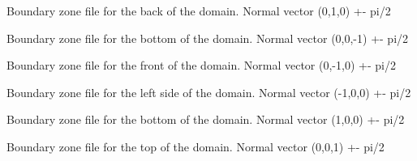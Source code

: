 \documentclass[letterpaper,10pt,english]{sphinxmanual}
\begin{document}

\label{\detokenize{output:pboundary-back-s-zone}}
Boundary zone file for the back of the domain. Normal vector (0,1,0) +- pi/2


\label{\detokenize{output:pboundary-bottom-zone}}
Boundary zone file for the bottom of the domain. Normal vector (0,0,-1) +- pi/2


\label{\detokenize{output:pboundary-front-n-zone}}
Boundary zone file for the front of the domain. Normal vector (0,-1,0) +- pi/2


\label{\detokenize{output:pboundary-left-w-zone}}
Boundary zone file for the left side of the domain. Normal vector (-1,0,0) +- pi/2


\label{\detokenize{output:pboundary-right-e-zone}}
Boundary zone file for the bottom of the domain. Normal  vector (1,0,0) +- pi/2


\label{\detokenize{output:pboundary-top-zone}}
Boundary zone file for the top of the domain. Normal vector (0,0,1) +- pi/2



\renewcommand{\indexname}{Index}
\printindex
\end{document}
